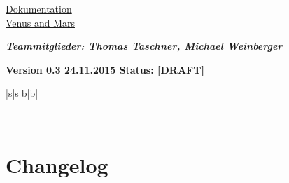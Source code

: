 \documentclass[12pt,a4paper,oneside,ngerman]{scrartcl}
\begin{document}
\thispagestyle{empty}
\vspace*{2cm}


\begin{center}
\begin{huge}
\renewcommand{\ULthickness}{2pt}
\uline{Dokumentation}
\\
\uline{Venus and Mars}
\end{huge}
\end{center}

\vspace{9cm}

\textit{\textbf{Teammitglieder: Thomas Taschner, Michael Weinberger}}
\vspace{10mm}

\textbf{{\color{g4}Version 0.3 \hfill 24.11.2015 \hfill Status: [DRAFT]}}
\\
\begin{table}[h]
\renewcommand{\arraystretch}{2.1}
\centering
\begin{tabularx}{\textwidth}{|s|s|b|b|}

\specialrule{0.07em}{0em}{0em}
 \\ \hline
\end{tabularx}
\end{table}
\newpage


\pagestyle{fancy}
\renewcommand{\headrulewidth}{0.4pt}
\renewcommand{\footrulewidth}{0.4pt}
\setlength\headheight{15pt}
\cfoot{}


\tableofcontents\thispagestyle{fancy}
\newpage


\section{Changelog}
\end{document}
